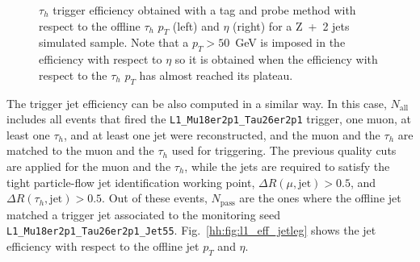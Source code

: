 \documentclass[../main.tex]{subfiles}
\begin{document}
\begin{figure}[h!]
\begin{center}
\end{center}
\caption{$\tau_h$ trigger efficiency obtained with a tag and probe method with respect to the offline $\tau_h$ $p_T$ (left) and $\eta$ (right) for a Z~+~2 jets simulated sample. Note that a $p_T>50$~GeV is imposed in the efficiency with respect to $\eta$ so it is obtained when the efficiency with respect to the $\tau_h$ $p_T$ has almost reached its plateau. }
\label{hh:fig:l1_eff_tauleg}
\end{figure}

The trigger jet efficiency can be also computed in a similar way. In this case, $N_\text{all}$ includes all events that fired the \texttt{L1\_Mu18er2p1\_Tau26er2p1} trigger, one muon, at least one $\tau_h$, and at least one jet were reconstructed, and the muon and the $\tau_h$ are matched to the muon and the $\tau_h$ used for triggering. The previous quality cuts are applied for the muon and the $\tau_h$, while the jets are required to satisfy the tight particle-flow jet identification working point, $\Delta R(\mu, \text{jet}) > 0.5$, and $\Delta R(\tau_h, \text{jet}) > 0.5$. Out of these events, $N_\text{pass}$ are the ones where the offline jet matched a trigger jet associated to the monitoring seed \texttt{L1\_Mu18er2p1\_Tau26er2p1\_Jet55}. Fig.~\ref{hh:fig:l1_eff_jetleg} shows the jet efficiency with respect to the offline jet $p_T$ and $\eta$.
\end{document}
